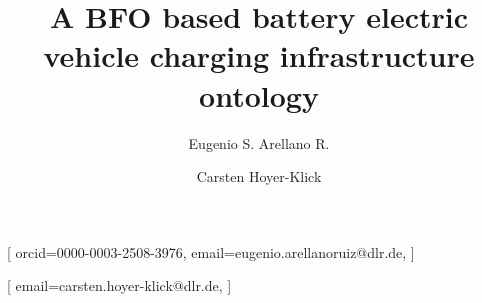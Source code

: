 \documentclass[hf]{ceurart}
\begin{document}
\makeatletter

\newlength\oriarrayrulewidth  
\newcount\orilowpenalty
\newcommand\nobreakmidrule{%
 \noalign{\global\oriarrayrulewidth\arrayrulewidth\relax
          \global\orilowpenalty\@lowpenalty\relax  
          \global\@lowpenalty=\numexpr-10000\relax%
          \global\arrayrulewidth\lightrulewidth\relax}
 \hline
 \noalign{\global\@lowpenalty=\orilowpenalty\relax%
          \global\arrayrulewidth\oriarrayrulewidth\relax}}

\makeatother


\title{A BFO based battery electric vehicle charging infrastructure ontology}

\author[1]{Eugenio S. Arellano R.}[%
orcid=0000-0003-2508-3976,
email=eugenio.arellanoruiz@dlr.de,
]
\author[1]{Carsten Hoyer-Klick}[%
email=carsten.hoyer-klick@dlr.de,
]


\address[1]{German Aerospace Center (DLR), Department of Energy Systems Analysis, Institute of Networked
	Energy Systems, Stuttgart, Germany}







\maketitle
















\newpage
\appendix
\end{document}
